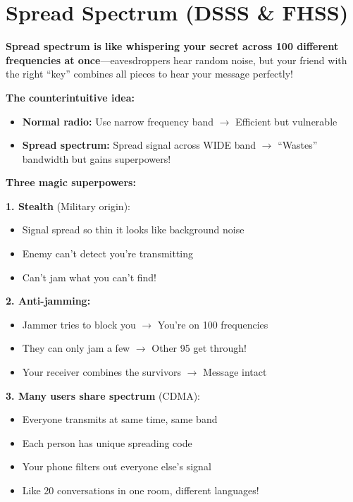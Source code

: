 \chapter{Spread Spectrum (DSSS \& FHSS)}
\label{ch:spread-spectrum}

\begin{nontechnical}
\textbf{Spread spectrum is like whispering your secret across 100 different frequencies at once}---eavesdroppers hear random noise, but your friend with the right ``key'' combines all pieces to hear your message perfectly!

\textbf{The counterintuitive idea:}
\begin{itemize}
\item \textbf{Normal radio:} Use narrow frequency band $\rightarrow$ Efficient but vulnerable
\item \textbf{Spread spectrum:} Spread signal across WIDE band $\rightarrow$ ``Wastes'' bandwidth but gains superpowers!
\end{itemize}

\textbf{Three magic superpowers:}

\textbf{1. Stealth} (Military origin):
\begin{itemize}
\item Signal spread so thin it looks like background noise
\item Enemy can't detect you're transmitting
\item Can't jam what you can't find!
\end{itemize}

\textbf{2. Anti-jamming:}
\begin{itemize}
\item Jammer tries to block you $\rightarrow$ You're on 100 frequencies
\item They can only jam a few $\rightarrow$ Other 95 get through!
\item Your receiver combines the survivors $\rightarrow$ Message intact
\end{itemize}

\textbf{3. Many users share spectrum} (CDMA):
\begin{itemize}
\item Everyone transmits at same time, same band
\item Each person has unique spreading code
\item Your phone filters out everyone else's signal
\item Like 20 conversations in one room, different languages!
\end{itemize}


\end{nontechnical}
